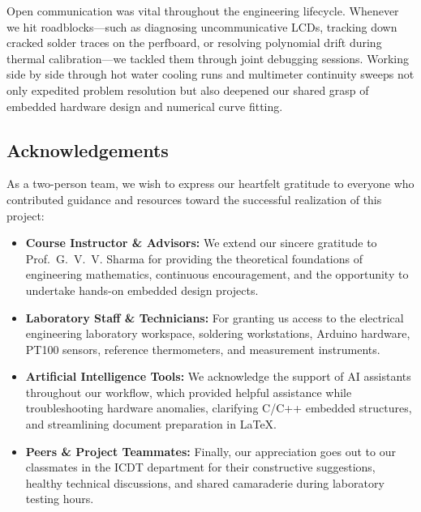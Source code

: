 \documentclass[journal,12pt,onecolumn]{IEEEtran}
\begin{document}
Open communication was vital throughout the engineering lifecycle. Whenever we hit roadblocks—such as diagnosing uncommunicative LCDs, tracking down cracked solder traces on the perfboard, or resolving polynomial drift during thermal calibration—we tackled them through joint debugging sessions. Working side by side through hot water cooling runs and multimeter continuity sweeps not only expedited problem resolution but also deepened our shared grasp of embedded hardware design and numerical curve fitting.

\subsection*{Acknowledgements}
As a two-person team, we wish to express our heartfelt gratitude to everyone who contributed guidance and resources toward the successful realization of this project:
\begin{itemize}
	\item \textbf{Course Instructor \& Advisors:} We extend our sincere gratitude to Prof.~G.~V.~V. Sharma for providing the theoretical foundations of engineering mathematics, continuous encouragement, and the opportunity to undertake hands-on embedded design projects.
	\item \textbf{Laboratory Staff \& Technicians:} For granting us access to the electrical engineering laboratory workspace, soldering workstations, Arduino hardware, PT100 sensors, reference thermometers, and measurement instruments.
	\item \textbf{Artificial Intelligence Tools:} We acknowledge the support of AI assistants throughout our workflow, which provided helpful assistance while troubleshooting hardware anomalies, clarifying C/C++ embedded structures, and streamlining document preparation in \LaTeX.
	\item \textbf{Peers \& Project Teammates:} Finally, our appreciation goes out to our classmates in the ICDT department for their constructive suggestions, healthy technical discussions, and shared camaraderie during laboratory testing hours.
\end{itemize}
\end{document}
